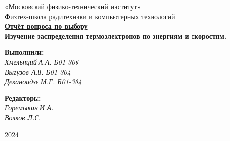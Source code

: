 
\pagecolor{default_color}

\pagecolor{white}
\pagestyle{fancy}
\fancyhf{}
\rfoot{}

\fancyhead{}
\fancyfoot[C]{\color{mycolor} \textit{\leftmark}}
\renewcommand{\headrulewidth}{0pt}
\fancypagestyle{plain}{
  \renewcommand{\headrulewidth}{0pt}
}


\thispagestyle{empty}

\begin{center}
\large{«Московский физико-технический институт»} \\  
\large{Физтех-школа радитехники и компьютерных технологий }\\
\vspace*{5cm}
{\bfseries
    {\Huge \underline{Отчёт вопроса по выбору} \\ \vspace*{0.5cm} Изучение распределения термоэлектронов по энергиям и скоростям.}
}
\end{center}

\vspace*{1cm}
\begin{flushright}
    \large{
    \textbf{Выполнили:} \\ \textit{
       Хмельнций А.А.  Б01-306 
    \\ Выгузов А.В.    Б01-304
    \\ Деканоидзе М.Г. Б01-304}
    }
    
    \large{
    \textbf{Редакторы:} \\ \textit{
       Горемыкин И.А.\\
       Волков Л.С.}
    }
\end{flushright}

\vspace*{10cm}
\begin{center}
2024
\end{center}

\newpage